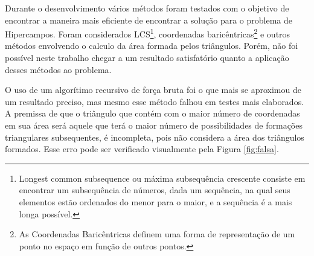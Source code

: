 \documentclass[12pt,a4paper]{article}
\begin{document}
Durante o desenvolvimento vários métodos foram testados com o objetivo de encontrar a maneira mais eficiente de encontrar a solução para o problema de Hipercampos. Foram considerados LCS\footnote{Longest common subsequence ou máxima subsequência crescente consiste em encontrar um subsequência de números, dada um sequência, na qual seus elementos estão ordenados  do menor para o maior, e a sequência é a mais longa possível.}, coordenadas baricêntricas\footnote{As Coordenadas Baricêntricas definem uma forma de representação de um ponto no espaço em função de outros pontos.} e outros métodos envolvendo o calculo da área formada pelos triângulos. Porém, não foi possível neste trabalho chegar a um resultado satisfatório quanto a aplicação desses métodos ao problema.

O uso de um algorítimo recursivo de força bruta foi o que mais se aproximou de um resultado preciso, mas mesmo esse método falhou em testes mais elaborados. A premissa de que o triângulo que contém com o maior número de coordenadas em sua área será aquele que terá o maior número de possibilidades de formações triangulares subsequentes, é incompleta, pois não considera a área dos triângulos formados. Esse erro pode ser verificado visualmente pela Figura \ref{fig:falsa}.
\end{document}
